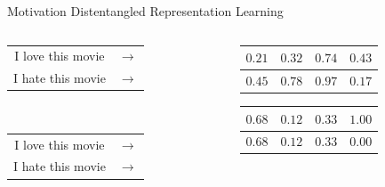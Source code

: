 \documentclass{beamer}
\begin{document}
\begin{frame}{Motivation}
	\centering
	{\Large Distentangled Representation Learning} \\
	\vspace{1cm}
	\begin{columns}[T] %
		\begin{column}{.3\textwidth}
			\centering
			\begin{tabular}{ c c }
				I love this movie & $\rightarrow$ \\
				I hate this movie & $\rightarrow$ \\
			\end{tabular} \\
			\vspace{1.8cm}
			{\color{white} \begin{tabular}{ c c }
					I love this movie & $\rightarrow$ \\
					I hate this movie & $\rightarrow$ \\
				\end{tabular}}
		\end{column}
		\hfill
		\begin{column}{.6\textwidth}
			\centering
			\begin{tabular}{ | c | c | c | c | }
				\hline
				$0.21$ & $0.32$ & $0.74$ & $0.43$ \\
				\hline
				\hline
				$0.45$ & $0.78$ & $0.97$ & $0.17$ \\
				\hline
			\end{tabular}
			{\color{white}{\Huge$$\Downarrow$$}
			\begin{tabular}{ | c | c | c | c | }
				\hline
				$0.68$ & $0.12$ & $0.33$ & $1.00$ \\
				\hline
				\hline
				$0.68$ & $0.12$ & $0.33$ & $0.00$ \\
				\hline
			\end{tabular}}
		\end{column}
	\end{columns}
\end{frame}
\end{document}
